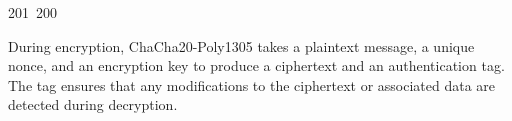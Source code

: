 201~200~\documentclass{article}
\begin{document}
	                                                                                                                                                                                                                                                                                                	                                                                                                                                        	    	                                                                                                	                                                                                                                                                                                                                                                                                                                                	                                                                        	                                                                        	                                                                                                                                        	                                                                                                                                                                                                                        	                                                                                                                            	                                                                	                                                                                                    During encryption, ChaCha20-Poly1305 takes a plaintext message, a unique nonce, and an encryption key to produce a ciphertext and an authentication tag. The tag ensures that any modifications to the ciphertext or associated data are detected during decryption.
\end{document}
